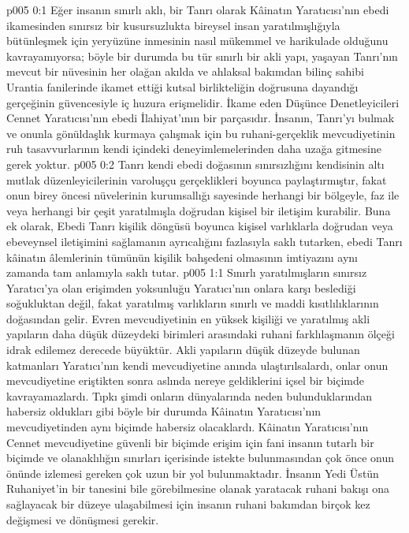 \vs p005 0:1 Eğer insanın sınırlı aklı, bir Tanrı olarak Kâinatın Yaratıcısı’nın ebedi ikamesinden sınırsız bir kusursuzlukta bireysel insan yaratılmışlığıyla bütünleşmek için yeryüzüne inmesinin nasıl mükemmel ve harikulade olduğunu kavrayamıyorsa; böyle bir durumda bu tür sınırlı bir akli yapı, yaşayan Tanrı’nın mevcut bir nüvesinin her olağan akılda ve ahlaksal bakımdan bilinç sahibi Urantia fanilerinde ikamet ettiği kutsal birlikteliğin doğrusuna dayandığı gerçeğinin güvencesiyle iç huzura erişmelidir. İkame eden Düşünce Denetleyicileri Cennet Yaratıcısı’nın ebedi İlahiyat’ının bir parçasıdır. İnsanın, Tanrı’yı bulmak ve onunla gönüldaşlık kurmaya çalışmak için bu ruhani\hyp{}gerçeklik mevcudiyetinin ruh tasavvurlarının kendi içindeki deneyimlemelerinden daha uzağa gitmesine gerek yoktur.
\vs p005 0:2 Tanrı kendi ebedi doğasının sınırsızlığını kendisinin altı mutlak düzenleyicilerinin varoluşçu gerçeklikleri boyunca paylaştırmıştır, fakat onun birey öncesi nüvelerinin kurumsallığı sayesinde herhangi bir bölgeyle, faz ile veya herhangi bir çeşit yaratılmışla doğrudan kişisel bir iletişim kurabilir. Buna ek olarak, Ebedi Tanrı kişilik döngüsü boyunca kişisel varlıklarla doğrudan veya ebeveynsel iletişimini sağlamanın ayrıcalığını fazlasıyla saklı tutarken, ebedi Tanrı kâinatın âlemlerinin tümünün kişilik bahşedeni olmasının imtiyazını aynı zamanda tam anlamıyla saklı tutar.
\vs p005 1:1 Sınırlı yaratılmışların sınırsız Yaratıcı’ya olan erişimden yoksunluğu Yaratıcı’nın onlara karşı beslediği soğukluktan değil, fakat yaratılmış varlıkların sınırlı ve maddi kısıtlılıklarının doğasından gelir. Evren mevcudiyetinin en yüksek kişiliği ve yaratılmış akli yapıların daha düşük düzeydeki birimleri arasındaki ruhani farklılaşmanın ölçeği idrak edilemez derecede büyüktür. Akli yapıların düşük düzeyde bulunan katmanları Yaratıcı’nın kendi mevcudiyetine anında ulaştırılsalardı, onlar onun mevcudiyetine eriştikten sonra aslında nereye geldiklerini içsel bir biçimde kavrayamazlardı. Tıpkı şimdi onların dünyalarında neden bulunduklarından habersiz oldukları gibi böyle bir durumda Kâinatın Yaratıcısı’nın mevcudiyetinden aynı biçimde habersiz olacaklardı. Kâinatın Yaratıcısı’nın Cennet mevcudiyetine güvenli bir biçimde erişim için fani insanın tutarlı bir biçimde ve olanaklılığın sınırları içerisinde istekte bulunmasından çok önce onun önünde izlemesi gereken çok uzun bir yol bulunmaktadır. İnsanın Yedi Üstün Ruhaniyet’in bir tanesini bile görebilmesine olanak yaratacak ruhani bakışı ona sağlayacak bir düzeye ulaşabilmesi için insanın ruhani bakımdan birçok kez değişmesi ve dönüşmesi gerekir.
